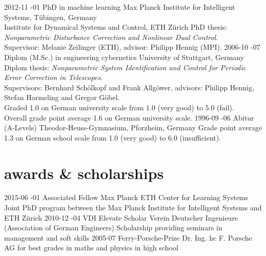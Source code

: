 \documentclass[a4paper]{k-cv} %
\begin{document}
\begin{entrylist}
  \entry
  {2012-11 -01}
  {PhD {\normalfont in machine learning}}
  {Max Planck Institute for Intelligent Systems, T\"ubingen, Germany\\
    \phantom{x} \hfill Institute for Dynamical Systems and Control, ETH
    Z{\"u}rich}
  {PhD thesis: \emph{Nonparametric Disturbance Correction and Nonlinear Dual Control}.\\
    Supervisor: Melanie Zeilinger (ETH), \mbox{advisor}: Philipp Hennig (MPI).}
  \entry
  {2006-10 -07}
  {Diplom {(M.Sc.) \normalfont in engineering cybernetics}}
  {University of Stuttgart, Germany}
  {Diplom thesis: \emph{Nonparametric System Identification and Control for
      Periodic Error Correction in Telescopes}.\\
    Supervisors: Bernhard Sch\"olkopf and Frank Allg\"ower, advisors: Philipp
    Hennig, Stefan Harmeling and Gregor G\"obel. \\
    Graded 1.0 on German university scale from 1.0 (very
    good) to 5.0 (fail).\\
    Overall grade point average 1.6 on German university
    scale.}
  \entry
  {1996-09 -06}
  {Abitur (A-Levels)}
  {Theodor-Heuss-Gymnasium, Pforzheim, Germany}
  {Grade point average 1.3 on German school scale from 1.0 (very good) to 6.0
    \mbox{(insufficient)}.}
\end{entrylist}

%
\section{awards \& scholarships}\normalfont

\begin{entrylist}
  \entry
  {2015-06 -01}
  {Associated Fellow}
  {Max Planck ETH Center for Learning Systems}
  {Joint PhD program between the Max Planck Institute for Intelligent Systems
    and ETH Z\"urich}
  \entry
  {2010-12 -04}
  {VDI Elevate Scholar}
  {Verein Deutscher Ingenieure (Association of German Engineers)}
  {Scholarship providing seminars in management and soft skills}
  \entry
  {2005-07}
  {Ferry-Porsche-Prize}
  {Dr. Ing. hc F. Porsche AG}
  {for best grades in maths and physics in high school}
\end{entrylist}
\end{document}
